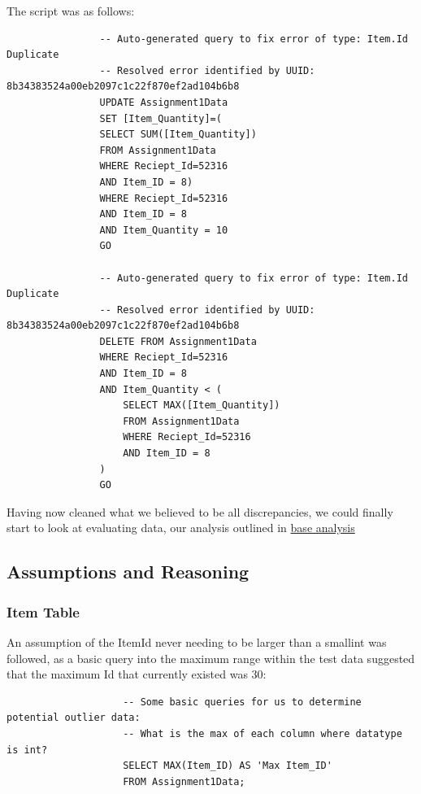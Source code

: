 \documentclass{article}
\begin{document}
            \newpage

            The script was as follows:
            \begin{lstlisting}
                -- Auto-generated query to fix error of type: Item.Id Duplicate
                -- Resolved error identified by UUID: 8b34383524a00eb2097c1c22f870ef2ad104b6b8
                UPDATE Assignment1Data 
                SET [Item_Quantity]=(
                SELECT SUM([Item_Quantity])
                FROM Assignment1Data
                WHERE Reciept_Id=52316
                AND Item_ID = 8)
                WHERE Reciept_Id=52316
                AND Item_ID = 8
                AND Item_Quantity = 10
                GO
                
                -- Auto-generated query to fix error of type: Item.Id Duplicate
                -- Resolved error identified by UUID: 8b34383524a00eb2097c1c22f870ef2ad104b6b8
                DELETE FROM Assignment1Data 
                WHERE Reciept_Id=52316
                AND Item_ID = 8
                AND Item_Quantity < (
                    SELECT MAX([Item_Quantity])
                    FROM Assignment1Data
                    WHERE Reciept_Id=52316
                    AND Item_ID = 8
                )
                GO
            \end{lstlisting}

            Having now cleaned what we believed to be all discrepancies, we could finally start to look at
            evaluating data, our analysis outlined in \hyperref[sec:BA]{\color{blue}base analysis}
        \newpage
        \subsection{Assumptions and Reasoning}
        \label{sec:AR}
            \subsubsection{Item Table}
                An assumption of the ItemId never needing to be larger than a smallint
                was followed, as a basic query into the maximum range within the test data
                suggested that the maximum Id that currently existed was 30:
                \begin{lstlisting}
                    -- Some basic queries for us to determine potential outlier data:
                    -- What is the max of each column where datatype is int?
                    SELECT MAX(Item_ID) AS 'Max Item_ID'
                    FROM Assignment1Data;
                \end{lstlisting}
\end{document}
